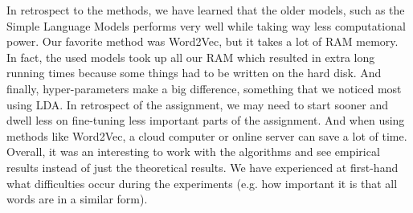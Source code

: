 In retrospect to the methods, we have learned that the older models, such as the Simple Language Models performs very well while taking way less computational power. Our favorite method was Word2Vec, but it takes a lot of RAM memory. In fact, the used models took up all our RAM which resulted in extra long running times because some things had to be written on the hard disk.
And finally, hyper-parameters make a big difference, something that we noticed most using LDA.
\newline
\newline
In retrospect of the assignment, we may need to start sooner and dwell less on fine-tuning less important parts of the assignment. And when using methods like Word2Vec, a cloud computer or online server can save a lot of time.
\newline
\newline
Overall, it was an interesting to work with the algorithms and see empirical results instead of just the theoretical results. We have experienced at first-hand what difficulties occur during the experiments (e.g. how important it is that all words are in a similar form).